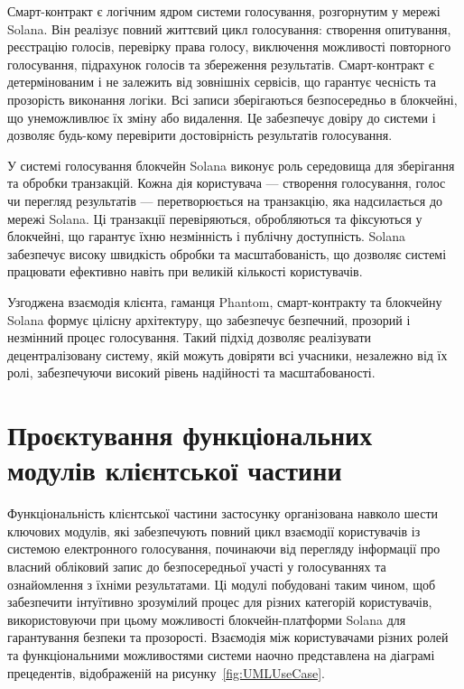 \documentclass[14pt]{extreport}
\begin{document}
  Смарт-контракт є логічним ядром системи голосування, розгорнутим у мережі Solana. Він реалізує повний життєвий цикл голосування: створення опитування, реєстрацію голосів, перевірку права голосу, виключення можливості повторного голосування, підрахунок голосів та збереження результатів. Смарт-контракт є детермінованим і не залежить від зовнішніх сервісів, що гарантує чесність та прозорість виконання логіки. Всі записи зберігаються безпосередньо в блокчейні, що унеможливлює їх зміну або видалення. Це забезпечує довіру до системи і дозволяє будь-кому перевірити достовірність результатів голосування.

  У системі голосування блокчейн Solana виконує роль середовища для зберігання та обробки транзакцій. Кожна дія користувача — створення голосування, голос чи перегляд результатів — перетворюється на транзакцію, яка надсилається до мережі Solana. Ці транзакції перевіряються, обробляються та фіксуються у блокчейні, що гарантує їхню незмінність і публічну доступність. Solana забезпечує високу швидкість обробки та масштабованість, що дозволяє системі працювати ефективно навіть при великій кількості користувачів.

  Узгоджена взаємодія клієнта, гаманця Phantom, смарт-контракту та блокчейну Solana формує цілісну архітектуру, що забезпечує безпечний, прозорий і незмінний процес голосування. Такий підхід дозволяє реалізувати децентралізовану систему, якій можуть довіряти всі учасники, незалежно від їх ролі, забезпечуючи високий рівень надійності та масштабованості.
  
  \section{Проєктування функціональних модулів клієнтської частини}
  
  Функціональність клієнтської частини застосунку організована навколо шести ключових модулів, які забезпечують повний цикл взаємодії користувачів із системою електронного голосування, починаючи від перегляду інформації про власний обліковий запис до безпосередньої участі у голосуваннях та ознайомлення з їхніми результатами. Ці модулі побудовані таким чином, щоб забезпечити інтуїтивно зрозумілий процес для різних категорій користувачів, використовуючи при цьому можливості блокчейн-платформи Solana для гарантування безпеки та прозорості. Взаємодія між користувачами різних ролей та функціональними можливостями системи наочно представлена на діаграмі прецедентів, відображеній на рисунку~\ref{fig:UMLUseCase}.
\end{document}
